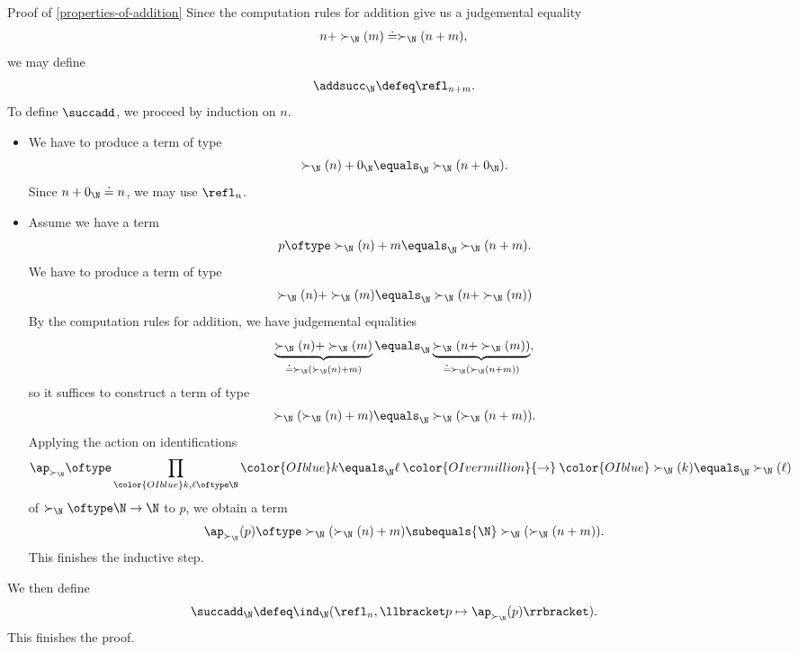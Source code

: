 \begin{Proof}{Proof of \cref{properties-of-addition}}
    Since the computation rules for addition give us a judgemental equality
    \[
        n+\succ_{\N}(m)%
        \doteq%
        \succ_{\N}(n+m),%
    \]%
    we may define
    \[
        \addsucc_{\N}%
        \defeq%
        \refl_{n+m}.%
    \]%
    To define $\succadd$, we proceed by induction on $n$.
    \begin{itemize}
        \item{}We have to produce a term of type
            \[
                \succ_{\N}(n)+0_{\N}%
                \equals_{\N}%
                \succ_{\N}(n+0_{\N}).%
            \]%
            Since $n+0_{\N}\doteq n$, we may use $\refl_{n}$.
        \item{}Assume we have a term
            \[
                p%
                \oftype%
                \succ_{\N}(n)+m%
                \equals_{\N}%
                \succ_{\N}(n+m).%
            \]%
            We have to produce a term of type
            \[
                \succ_{\N}(n)+\succ_{\N}(m)%
                \equals_{\N}%
                \succ_{\N}(n+\succ_{\N}(m))%
            \]%
            By the computation rules for addition, we have judgemental equalities
            \[
                \underbrace{\succ_{\N}(n)+\succ_{\N}(m)}_{{}\doteq\succ_{\N}(\succ_{\N}(n)+m)}%
                \equals_{\N}%
                \underbrace{\succ_{\N}(n+\succ_{\N}(m))}_{{}\doteq\succ_{\N}(\succ_{\N}(n+m))},%
            \]%
            so it suffices to construct a term of type
            \[
                \succ_{\N}(\succ_{\N}(n)+m)%
                \equals_{\N}%
                \succ_{\N}(\succ_{\N}(n+m)).%
            \]%
            Applying the action on identifications
            \[
                \ap_{\succ_{\N}}%
                \oftype%
                \prod_{{\color{OIblue}k,\ell\oftype\N}}{\color{OIblue}k\equals_{\N}\ell}\mathbin{\color{OIvermillion}{\to}}{\color{OIblue}\succ_{\N}(k)\equals_{\N}\succ_{\N}(\ell)}%
            \]%
            of $\succ_{\N}\oftype\N\to\N$ to $p$, we obtain a term
            \[
                \ap_{\succ_{\N}}(p)%
                \oftype%
                \succ_{\N}(\succ_{\N}(n)+m)%
                \subequals{\N}%
                \succ_{\N}(\succ_{\N}(n+m)).%
            \]%
            This finishes the inductive step.
    \end{itemize}
    We then define
    \[
        \succadd_{\N}%
        \defeq%
        \ind_{\N}(\refl_{n},\llbracket p\mapsto\ap_{\succ_{\N}}(p)\rrbracket).%
    \]%
    This finishes the proof.


\end{Proof}
